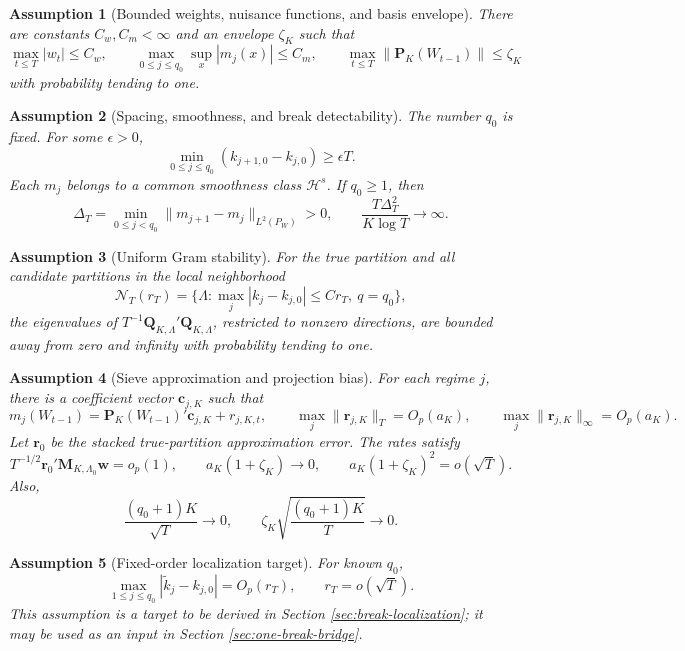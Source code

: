 \documentclass[12pt]{article}
\numberwithin{equation}{section}
\newtheorem{assumption}{Assumption}
\theoremstyle{definition}
\begin{document}
\begin{assumption}[Bounded weights, nuisance functions, and basis envelope]
\label{ass:prim-bounded}
There are constants \(C_w,C_m<\infty\) and an envelope \(\zeta_K\) such that
\[
    \max_{t\leq T}|w_t|\leq C_w,
    \qquad
    \max_{0\leq j\leq q_0}\sup_x|m_j(x)|\leq C_m,
    \qquad
    \max_{t\leq T}\|\bm P_K(W_{t-1})\|\leq \zeta_K
\]
with probability tending to one.
\end{assumption}

\begin{assumption}[Spacing, smoothness, and break detectability]
\label{ass:prim-breaks}
The number \(q_0\) is fixed. For some \(\epsilon>0\),
\[
    \min_{0\leq j\leq q_0}(k_{j+1,0}-k_{j,0})\geq \epsilon T.
\]
Each \(m_j\) belongs to a common smoothness class \(\mathcal H^s\). If \(q_0\geq1\), then
\[
    \Delta_T=\min_{0\leq j<q_0}\|m_{j+1}-m_j\|_{L^2(P_W)}>0,
    \qquad
    \frac{T\Delta_T^2}{K\log T}\to\infty.
\]
\end{assumption}

\begin{assumption}[Uniform Gram stability]
\label{ass:prim-gram}
For the true partition and all candidate partitions in the local neighborhood
\[
    \mathcal N_T(r_T)
    =
    \{\Lambda:\max_j|k_j-k_{j,0}|\leq C r_T,\ q=q_0\},
\]
the eigenvalues of \(T^{-1}\bm Q_{K,\Lambda}'\bm Q_{K,\Lambda}\), restricted to nonzero directions, are bounded away from zero and infinity with probability tending to one.
\end{assumption}

\begin{assumption}[Sieve approximation and projection bias]
\label{ass:prim-sieve}
For each regime \(j\), there is a coefficient vector \(\bm c_{j,K}\) such that
\[
    m_j(W_{t-1})
    =
    \bm P_K(W_{t-1})'\bm c_{j,K}+r_{j,K,t},
    \qquad
    \max_j\|\bm r_{j,K}\|_T=O_p(a_K),
    \qquad
    \max_j\|\bm r_{j,K}\|_\infty=O_p(a_K).
\]
Let \(\bm r_0\) be the stacked true-partition approximation error. The rates satisfy
\[
    T^{-1/2}\bm r_0'\bm M_{K,\Lambda_0}\bm w=o_p(1),
    \qquad
    a_K(1+\zeta_K)\to0,
    \qquad
    a_K(1+\zeta_K)^2=o(\sqrt T).
\]
Also,
\[
    \frac{(q_0+1)K}{\sqrt T}\to0,
    \qquad
    \zeta_K\sqrt{\frac{(q_0+1)K}{T}}\to0.
\]
\end{assumption}

\begin{assumption}[Fixed-order localization target]
\label{ass:prim-localization-target}
For known \(q_0\),
\[
    \max_{1\leq j\leq q_0}|\widetilde k_j-k_{j,0}|=O_p(r_T),
    \qquad
    r_T=o(\sqrt T).
\]
This assumption is a target to be derived in Section \ref{sec:break-localization}; it may be used as an input in Section \ref{sec:one-break-bridge}.
\end{assumption}
\end{document}
